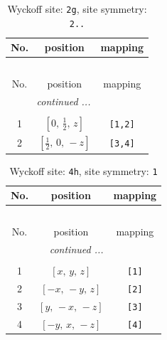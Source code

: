 \documentclass[fleqn,8pt]{jsarticle}
\begin{document}
\renewcommand{\arraystretch}{1.2}
\begin{longtable}{ccc}
\caption{Wyckoff site: {\tt 2g}, site symmetry: {\tt 2..}}
 \\
 \hline \hline
No. & position & mapping \\ \hline \endfirsthead

\multicolumn{2}{l}{\tablename\ \thetable{}} \\
 \hline \hline
No. & position & mapping \\ \hline \endhead

 \hline \hline
\multicolumn{2}{r}{\footnotesize\it continued ...} \\ \endfoot

 \hline \hline
\multicolumn{2}{r}{} \\ \endlastfoot

1 & $\left[ 0,\, \frac{1}{2},\, z \right]$ & {\tt [1,2]} \\ \hline
2 & $\left[ \frac{1}{2},\, 0,\, - z \right]$ & {\tt [3,4]} \\
\end{longtable}
\renewcommand{\arraystretch}{1.2}
\begin{longtable}{ccc}
\caption{Wyckoff site: {\tt 4h}, site symmetry: {\tt 1}}
 \\
 \hline \hline
No. & position & mapping \\ \hline \endfirsthead

\multicolumn{2}{l}{\tablename\ \thetable{}} \\
 \hline \hline
No. & position & mapping \\ \hline \endhead

 \hline \hline
\multicolumn{2}{r}{\footnotesize\it continued ...} \\ \endfoot

 \hline \hline
\multicolumn{2}{r}{} \\ \endlastfoot

1 & $\left[ x,\, y,\, z \right]$ & {\tt [1]} \\ \hline
2 & $\left[ - x,\, - y,\, z \right]$ & {\tt [2]} \\ \hline
3 & $\left[ y,\, - x,\, - z \right]$ & {\tt [3]} \\ \hline
4 & $\left[ - y,\, x,\, - z \right]$ & {\tt [4]} \\
\end{longtable}
\end{document}
